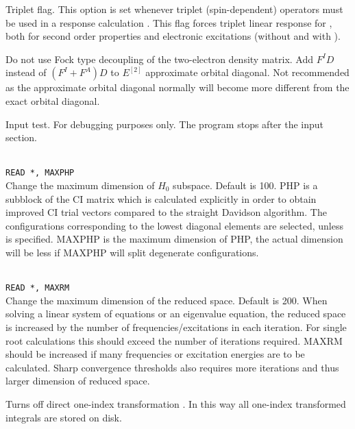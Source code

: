 \begin{description}
\item{}
Triplet flag. This option is set whenever triplet
(spin-dependent)
operators must be used in a response calculation
\cite{jodlypjjcp91,ovhapjhjajthjojcp97}.
This flag forces triplet linear response for ,
both for second order properties and electronic excitations
(without and with ).

\item{}
Do not use Fock type decoupling of the two-electron density matrix.
Add $F^ID$ instead of $(F^I+F^A)D$ to $E^{[2]}$ approximate
orbital diagonal. Not recommended as the approximate orbital diagonal
normally will become more different from the exact orbital diagonal.

\item{}
Input test. For debugging purposes only. The program stops after the
input section.

\item{}\\
\verb|READ *, MAXPHP|\\
Change the maximum dimension of $H_0$ subspace.   Default is 100.
PHP is a subblock of the CI matrix which is calculated explicitly
in order to obtain improved CI trial vectors compared to the
straight Davidson algorithm\cite{erdjcp17}.  The configurations
corresponding to 
the lowest diagonal elements are selected, unless  is
specified. MAXPHP is the maximum dimension of PHP, the 
actual dimension will be less if MAXPHP will split degenerate configurations.
 
\item{}\\
\verb|READ *, MAXRM |\\
Change the maximum dimension of the reduced space. Default is 200.
When solving a linear system of equations or an eigenvalue equation,
the reduced space is increased by the number of
frequencies/excitations in each iteration. For single root
calculations this should exceed the number of iterations required.
MAXRM should be increased if many frequencies or excitation energies
are to be calculated.
Sharp convergence thresholds also requires
more iterations and thus larger dimension of reduced space.

\item{}
Turns off direct one-index transformation \cite{ovhahjajjcc15}. 
In this way all one-index transformed integrals are stored on disk.


\end{description}
